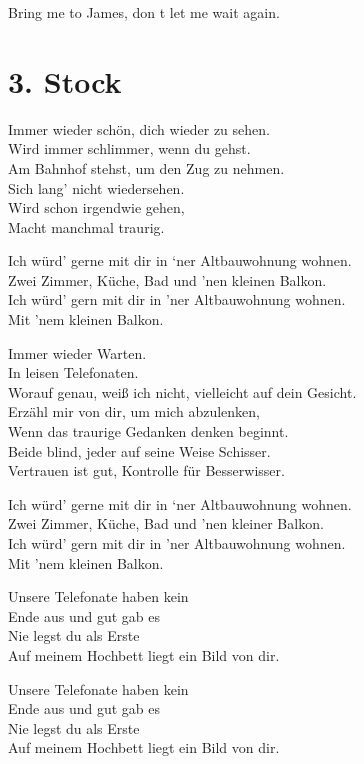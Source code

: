 \documentclass[]{book}
\begin{document}
Bring me to James, don t let me wait again.

\hypertarget{stock-2}{%
\section{3. Stock}\label{stock-2}}

Immer wieder schön, dich wieder zu sehen.\\
Wird immer schlimmer, wenn du gehst.\\
Am Bahnhof stehst, um den Zug zu nehmen.\\
Sich lang' nicht wiedersehen.\\
Wird schon irgendwie gehen,\\
Macht manchmal traurig.

Ich würd' gerne mit dir in `ner Altbauwohnung wohnen.\\
Zwei Zimmer, Küche, Bad und 'nen kleinen Balkon.\\
Ich würd' gern mit dir in 'ner Altbauwohnung wohnen.\\
Mit 'nem kleinen Balkon.

Immer wieder Warten.\\
In leisen Telefonaten.\\
Worauf genau, weiß ich nicht, vielleicht auf dein Gesicht.\\
Erzähl mir von dir, um mich abzulenken,\\
Wenn das traurige Gedanken denken beginnt.\\
Beide blind, jeder auf seine Weise Schisser.\\
Vertrauen ist gut, Kontrolle für Besserwisser.

Ich würd' gerne mit dir in `ner Altbauwohnung wohnen.\\
Zwei Zimmer, Küche, Bad und 'nen kleiner Balkon.\\
Ich würd' gern mit dir in 'ner Altbauwohnung wohnen.\\
Mit 'nem kleinen Balkon.

Unsere Telefonate haben kein\\
Ende aus und gut gab es\\
Nie legst du als Erste\\
Auf meinem Hochbett liegt ein Bild von dir.

Unsere Telefonate haben kein\\
Ende aus und gut gab es\\
Nie legst du als Erste\\
Auf meinem Hochbett liegt ein Bild von dir.
\end{document}
